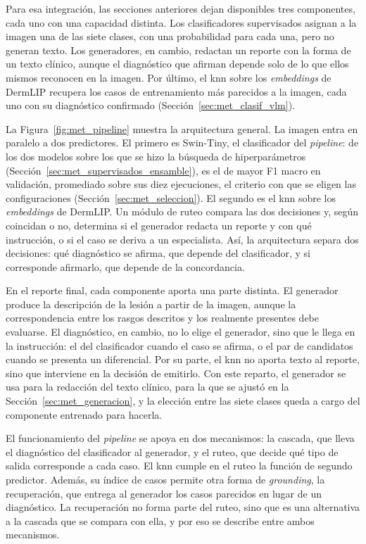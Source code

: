Para esa integración, las secciones anteriores dejan disponibles tres componentes, cada uno con una capacidad distinta.
Los clasificadores supervisados asignan a la imagen una de las siete clases, con una probabilidad para cada una, pero
no generan texto. Los generadores, en cambio, redactan un reporte con la forma de un texto clínico, aunque el
diagnóstico que afirman depende solo de lo que ellos mismos reconocen en la imagen. Por último, el \gls{knn} sobre los
\emph{embeddings} de DermLIP recupera los casos de entrenamiento más parecidos a la imagen, cada uno con su diagnóstico
confirmado (Sección~\ref{sec:met_clasif_vlm}).

La Figura~\ref{fig:met_pipeline} muestra la arquitectura general. La imagen entra en paralelo a dos predictores. El
primero es Swin-Tiny, el clasificador del \emph{pipeline}: de los dos modelos sobre los que se hizo la búsqueda de
hiperparámetros (Sección~\ref{sec:met_supervisados_ensamble}), es el de mayor F1 macro en validación, promediado sobre sus diez ejecuciones, el criterio con que se eligen las configuraciones (Sección~\ref{sec:met_seleccion}). El segundo es el \gls{knn} sobre los
\emph{embeddings} de DermLIP. Un módulo de ruteo compara las dos decisiones y, según coincidan o no, determina si el
generador redacta un reporte y con qué instrucción, o si el caso se deriva a un especialista. Así, la arquitectura
separa dos decisiones: qué diagnóstico se afirma, que depende del clasificador, y si corresponde afirmarlo, que
depende de la concordancia.



En el reporte final, cada componente aporta una parte distinta. El generador produce la descripción de la lesión a partir de la imagen, aunque la correspondencia entre los rasgos descritos y los realmente presentes debe evaluarse. El diagnóstico, en cambio, no lo elige el generador,
sino que le llega en la instrucción: el del clasificador cuando el caso se afirma, o el par de candidatos cuando se
presenta un diferencial. Por su parte, el \gls{knn} no aporta texto al reporte, sino que interviene en la decisión de
emitirlo. Con este reparto, el generador se usa para la redacción del texto clínico, para la que se ajustó en la
Sección~\ref{sec:met_generacion}, y la elección entre las siete clases queda a cargo del componente entrenado para
hacerla.

El funcionamiento del \emph{pipeline} se apoya en dos mecanismos: la cascada, que lleva el diagnóstico del
clasificador al generador, y el ruteo, que decide qué tipo de salida corresponde a cada caso. El \gls{knn} cumple en
el ruteo la función de segundo predictor. Además, su índice de casos permite otra forma de \emph{grounding}, la
recuperación, que entrega al generador los casos parecidos en lugar de un diagnóstico. La recuperación no forma parte
del ruteo, sino que es una alternativa a la cascada que se compara con ella, y por eso se describe entre ambos
mecanismos.

